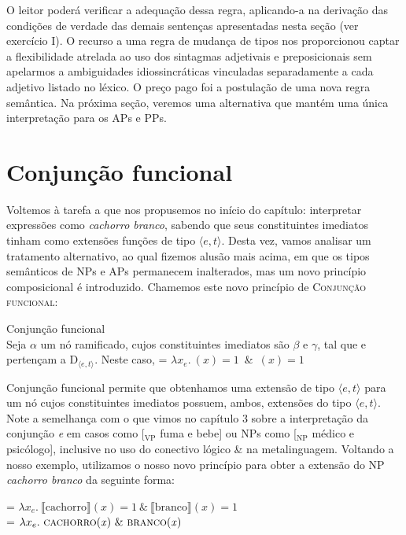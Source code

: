 \n O leitor poderá verificar a adequação dessa regra, aplicando-a
na derivação das condições de verdade das demais sentenças
apresentadas nesta seção (ver exercício I). O recurso a uma regra de mudança de tipos nos proporcionou captar a flexibilidade atrelada ao uso dos sintagmas adjetivais e preposicionais sem apelarmos a ambiguidades idiossincráticas vinculadas separadamente a cada adjetivo listado no léxico. O preço pago foi a postulação de uma nova regra semântica. Na próxima seção, veremos uma alternativa que mantém uma única interpretação para os APs e PPs. 

\section{Conjunção funcional}

Voltemos à tarefa a que nos propusemos no
início do capítulo: interpretar expressões como \textit{cachorro
branco}, sabendo que seus constituintes imediatos tinham como extensões funções de tipo $\langle e,t\rangle$. Desta vez, vamos
analisar um tratamento alternativo, ao qual fizemos alusão mais
acima, em que os tipos semânticos de NPs e APs permanecem
inalterados, mas um novo princípio composicional é introduzido.
Chamemos este novo princípio de \textsc{Conjunção funcional}:

\begin{exe}
	\ex Conjunção funcional \\
	Seja $\alpha$ um nó ramificado, cujos constituintes imediatos são $\beta$ e $\gamma$, tal que \den{$\beta$} e \den{$\gamma$} pertençam a D$_{\langle e,t\rangle}$. Neste caso, \den{$\alpha$} = $\lambda x_{e}.\ $\den{$\beta$}$(\textit{x}) = 1$\ \&\ \den{$\gamma$}$(\textit{x}) = 1$
\end{exe}


\n Conjunção funcional permite que obtenhamos uma extensão de tipo
$\langle e,t\rangle$ para um nó cujos constituintes imediatos
possuem, ambos, extensões do tipo $\langle e,t\rangle$. Note a semelhança com o que vimos no capítulo 3 sobre a interpretação
da conjunção \textit{e} em casos como [$_{\text{VP}}$ fuma e bebe] ou NPs como [$_{\text{NP}}$ médico e psicólogo], inclusive no uso do conectivo lógico \& na metalinguagem. Voltando a
nosso exemplo, utilizamos o nosso novo princípio para obter a
extensão do NP \textit{cachorro branco} da seguinte forma:

\begin{exe}
	\ex {} = $\lambda x_{e}.\ \llbracket  \text{cachorro} \rrbracket(x) = 1\ \&\ \llbracket \text{branco} \rrbracket(x) = 1$\\
	 = $\lambda x_{e}.\ \predica{cachorro}{x}\ \&\ \predica{branco}{x}$
\end{exe}

